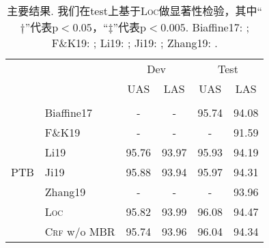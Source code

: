 \begin{table}[tb!]
  \centering
  \caption{主要结果. 我们在test上基于\textsc{Loc}做显著性检验，其中``$\dagger$''代表$\mathrm{p} < 0.05$，``$\ddagger$''代表$\mathrm{p} < 0.005$.
    Biaffine17: \citet{dozat-etal-2017-biaffine}; F\&K19: \citet{falenska-kuhn-2019-non};
    Li19: \citet{li-etal-2019-attentive}; Ji19: \citet{ji-etal-2019-graph};
    Zhang19: \citet{zhang-etal-2019-empirical}.
  }
  \begin{tabular}{llcccc}
    \toprule
                             &                        & \multicolumn{2}{c}{Dev} & \multicolumn{2}{c}{Test}                                                                       \\
                             &                        & UAS                     & LAS                      & UAS                              & LAS                              \\[2pt]
    \hline
    \\[-15pt]
    \multirow{10}{*}{PTB}    & Biaffine17             & -                       & -                        & 95.74                            & 94.08                            \\
                             & F\&K19                 & -                       & -                        & -                                & 91.59                            \\
                             & Li19                   & 95.76                   & 93.97                    & 95.93                            & 94.19                            \\
                             & Ji19                   & 95.88                   & 93.94                    & 95.97                            & 94.31                            \\
                             & Zhang19                & -                       & -                        & -                                & 93.96                            \\[3pt]
                             & \textsc{Loc}           & 95.82                   & 93.99                    & 96.08                            & 94.47                            \\
                             & \textsc{Crf} w/o MBR   & 95.74                   & 93.96                    & 96.04                            & 94.34                            \\

\end{tabular}
\end{table}
